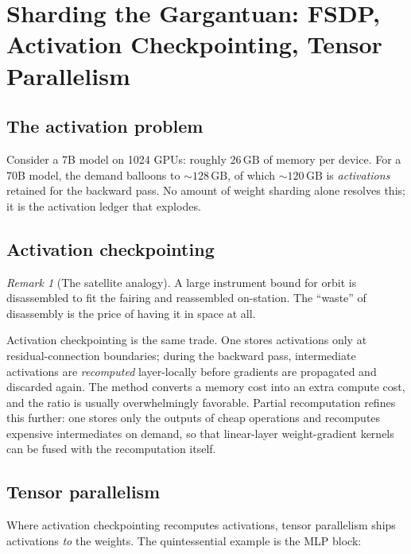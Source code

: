 \documentclass[11pt,a4paper]{article}
\theoremstyle{definition}
\theoremstyle{remark}
\newtheorem{remark}[definition]{Remark}
\theoremstyle{plain}
\newcommand{\GB}{\,\text{GB}}
\begin{document}
\section{Sharding the Gargantuan: FSDP, Activation Checkpointing, Tensor Parallelism}
\label{sec:sharding}

\subsection{The activation problem}

Consider a 7B model on 1024 GPUs: roughly $26\GB$ of memory per device. For a 70B model, the demand balloons to $\sim 128\GB$, of which $\sim 120\GB$ is \emph{activations} retained for the backward pass. No amount of weight sharding alone resolves this; it is the activation ledger that explodes.

\subsection{Activation checkpointing}

\begin{remark}[The satellite analogy]
A large instrument bound for orbit is disassembled to fit the fairing and reassembled on-station. The ``waste'' of disassembly is the price of having it in space at all.
\end{remark}

Activation checkpointing is the same trade. One stores activations only at residual-connection boundaries; during the backward pass, intermediate activations are \emph{recomputed} layer-locally before gradients are propagated and discarded again. The method converts a memory cost into an extra compute cost, and the ratio is usually overwhelmingly favorable. Partial recomputation refines this further: one stores only the outputs of cheap operations and recomputes expensive intermediates on demand, so that linear-layer weight-gradient kernels can be fused with the recomputation itself.

\subsection{Tensor parallelism}

Where activation checkpointing recomputes activations, tensor parallelism ships activations \emph{to} the weights. The quintessential example is the MLP block:
\end{document}
